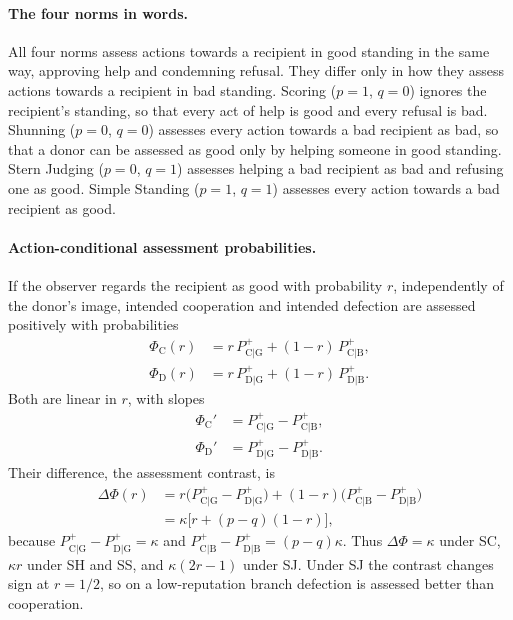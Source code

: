\documentclass[10pt]{wlscirep}
\newcommand{\Pp}[1]{P^{+}_{\mathrm{#1}}}   %
\newcommand{\PhiC}{\Phi_{\mathrm{C}}}
\newcommand{\PhiD}{\Phi_{\mathrm{D}}}
\theoremstyle{plain}
\theoremstyle{remark}
\begin{document}
\paragraph{The four norms in words.} All four norms assess actions towards a recipient in good standing in the same way, approving help and condemning refusal. They differ only in how they assess actions towards a recipient in bad standing. Scoring ($p=1$, $q=0$) ignores the recipient's standing, so that every act of help is good and every refusal is bad. Shunning ($p=0$, $q=0$) assesses every action towards a bad recipient as bad, so that a donor can be assessed as good only by helping someone in good standing. Stern Judging ($p=0$, $q=1$) assesses helping a bad recipient as bad and refusing one as good. Simple Standing ($p=1$, $q=1$) assesses every action towards a bad recipient as good.

\paragraph{Action-conditional assessment probabilities.} If the observer regards the recipient as good with probability $r$, independently of the donor's image, intended cooperation and intended defection are assessed positively with probabilities
\begin{equation}
\begin{aligned}
\PhiC(r)&=r\,\Pp{C|G}+(1-r)\,\Pp{C|B},\\
\PhiD(r)&=r\,\Pp{D|G}+(1-r)\,\Pp{D|B}.
\end{aligned}
\label{eq:s-phi}
\end{equation}
Both are linear in $r$, with slopes
\begin{equation}
\begin{aligned}
\PhiC'&=\Pp{C|G}-\Pp{C|B},\\
\PhiD'&=\Pp{D|G}-\Pp{D|B}.
\end{aligned}
\label{eq:s-phi-slopes}
\end{equation}
Their difference, the assessment contrast, is
\begin{equation}
\begin{aligned}
\Delta\Phi(r)&=r\bigl(\Pp{C|G}-\Pp{D|G}\bigr)+(1-r)\bigl(\Pp{C|B}-\Pp{D|B}\bigr)\\
&=\kappa\bigl[r+(p-q)(1-r)\bigr],
\end{aligned}
\label{eq:s-contrast}
\end{equation}
because $\Pp{C|G}-\Pp{D|G}=\kappa$ and $\Pp{C|B}-\Pp{D|B}=(p-q)\kappa$. Thus $\Delta\Phi=\kappa$ under SC, $\kappa r$ under SH and SS, and $\kappa(2r-1)$ under SJ. Under SJ the contrast changes sign at $r=1/2$, so on a low-reputation branch defection is assessed better than cooperation.
\end{document}
